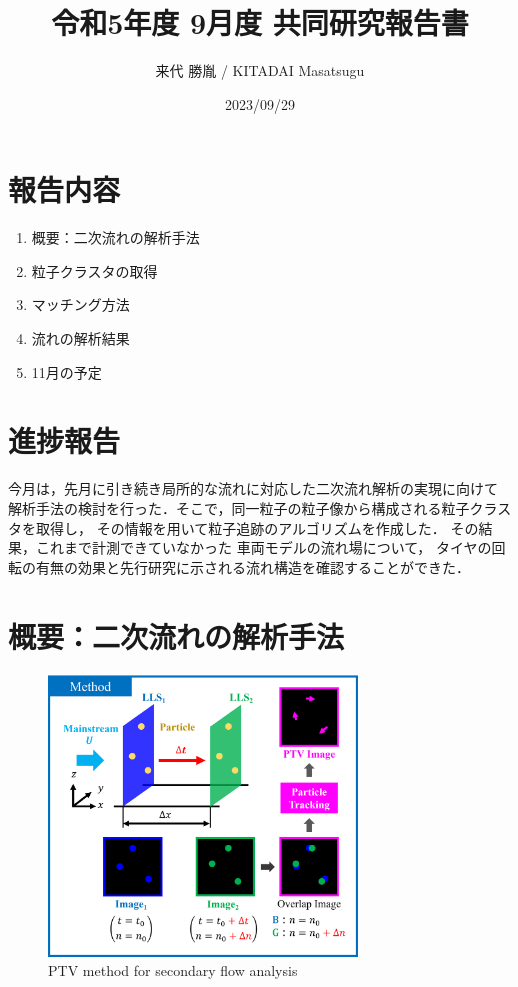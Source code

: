 \documentclass[twocolumn,a4j]{jsarticle}
\author{来代 勝胤 / KITADAI Masatsugu}
\title{令和5年度 9月度 共同研究報告書}
\date{2023/09/29}
\begin{document}
\columnseprule=0.1mm
\maketitle

\section*{報告内容}
\begin{enumerate}[1.]
	\item 概要：二次流れの解析手法
	\item 粒子クラスタの取得
	\item マッチング方法
	\item 流れの解析結果
	\item 11月の予定
\end{enumerate}

\section*{進捗報告}
今月は，先月に引き続き局所的な流れに対応した二次流れ解析の実現に向けて
解析手法の検討を行った．そこで，同一粒子の粒子像から構成される粒子クラスタを取得し，
その情報を用いて粒子追跡のアルゴリズムを作成した．
その結果，これまで計測できていなかった
車両モデルの流れ場について，
タイヤの回転の有無の効果と先行研究に示される流れ構造を確認することができた．

\section{概要：二次流れの解析手法}
\begin{figure}[htbp]
	\centering
	\includegraphics[keepaspectratio, width=82mm]{../images/method.png}
	\caption{PTV method for secondary flow analysis}
\end{figure}
\end{document}
